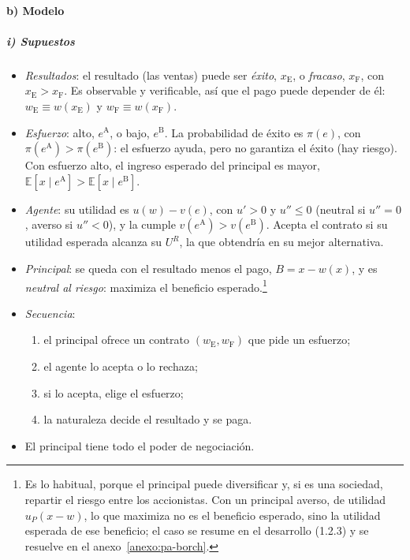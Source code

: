 \documentclass[11pt]{article}
\begin{document}
\paragraph{b) Modelo}

\subparagraph{i) Supuestos}

\begin{itemize}
\item \emph{Resultados}: el resultado (las ventas) puede ser \emph{éxito}, $x_{\mathrm{E}}$, o \emph{fracaso}, $x_{\mathrm{F}}$, con $x_{\mathrm{E}}>x_{\mathrm{F}}$. Es observable y verificable, así que el pago puede depender de él: $w_{\mathrm{E}}\equiv w(x_{\mathrm{E}})$ y $w_{\mathrm{F}}\equiv w(x_{\mathrm{F}})$.
\item \emph{Esfuerzo}: alto, $e^{\mathrm{A}}$, o bajo, $e^{\mathrm{B}}$. La probabilidad de éxito es $\pi(e)$, con $\pi(e^{\mathrm{A}})>\pi(e^{\mathrm{B}})$: el esfuerzo ayuda, pero no garantiza el éxito (hay riesgo). Con esfuerzo alto, el ingreso esperado del principal es mayor, $\mathbb{E}[x\mid e^{\mathrm{A}}]>\mathbb{E}[x\mid e^{\mathrm{B}}]$.
\item \emph{Agente}: su utilidad es $u(w)-v(e)$, con $u'>0$ y $u''\leq 0$ (neutral si $u''=0$, averso si $u''<0$), y la  cumple $v(e^{\mathrm{A}})>v(e^{\mathrm{B}})$. Acepta el contrato si su utilidad esperada alcanza su  $U^R$, la que obtendría en su mejor alternativa.
\item \emph{Principal}: se queda con el resultado menos el pago, $B=x-w(x)$, y es \emph{neutral al riesgo}: maximiza el beneficio esperado.\footnote{Es lo habitual, porque el principal puede diversificar y, si es una sociedad, repartir el riesgo entre los accionistas. Con un principal averso, de utilidad $u_P(x-w)$, lo que maximiza no es el beneficio esperado, sino la utilidad esperada de ese beneficio; el caso se resume en el desarrollo (1.2.3) y se resuelve en el anexo~\ref{anexo:pa-borch}.}
\item \emph{Secuencia}:
  \begin{enumerate}
  \item el principal ofrece un contrato $(w_{\mathrm{E}},w_{\mathrm{F}})$ que pide un esfuerzo;
  \item el agente lo acepta o lo rechaza;
  \item si lo acepta, elige el esfuerzo;
  \item la naturaleza decide el resultado y se paga.
  \end{enumerate}
\item El principal tiene todo el poder de negociación.
\end{itemize}
\end{document}
